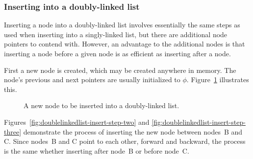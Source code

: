 \documentclass{article}
\begin{document}
  \subsubsection{Inserting into a doubly-linked list}
  Inserting a node into a doubly-linked list involves essentially the same steps as used when inserting into a singly-linked list, but there are additional node pointers to contend with. However, an advantage to the additional nodes is that inserting a node before a given node is as efficient as inserting after a node.

  First a new node is created, which may be created anywhere in memory. The node's previous and next pointers are usually initialized to $\phi$. Figure~\ref{fig:doublelinkedlist-newnode} illustrates this.
  \begin{figure}[H]
    \centering
    \caption{A new node to be inserted into a doubly-linked list.}
    \label{fig:doublelinkedlist-newnode}
  \end{figure}

  Figures~\ref{fig:doublelinkedlist-insert-step-two} and \ref{fig:doublelinkedlist-insert-step-three} demonstrate the process of inserting the new node between nodes~B and C. Since nodes~B and C point to each other, forward and backward, the process is the same whether inserting after node~B or before node~C.
\end{document}
